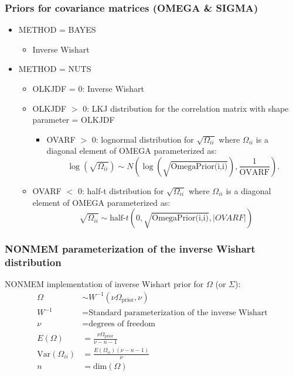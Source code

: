 \documentclass{beamer}
\begin{document}
\begin{frame}
  \frametitle{Priors for covariance matrices (OMEGA \& SIGMA)}

    \begin{itemize}
  \item METHOD = BAYES
    \begin{itemize}
    \item Inverse Wishart
    \end{itemize}
    \item METHOD = NUTS
      \begin{itemize}
      \item OLKJDF = 0: Inverse Wishart
       \item OLKJDF $>$ 0: LKJ distribution for the correlation matrix
         with shape parameter = OLKJDF
         \begin{itemize}
         \item OVARF $>$ 0: lognormal distribution for
           $\sqrt{\Omega_{ii}}$ where $\Omega_{ii}$ is a diagonal
           element of OMEGA parameterized as:
           $$
           \log(\sqrt{\Omega_{ii}}) \sim
           N\left(\log\left(\sqrt{\text{OmegaPrior(i,i)}}\right), \frac{1}{\text{OVARF}}\right).
           $$
         \end{itemize}
       \item OVARF $<$ 0:  half-t distribution for
           $\sqrt{\Omega_{ii}}$ where $\Omega_{ii}$ is a diagonal
           element of OMEGA parameterized as:
           $$
           \sqrt{\Omega_{ii}} \sim \text{half-}t\left(0,
             \sqrt{\text{OmegaPrior(i,i)}}, \left|OVARF\right|\right)
             $$
     \end{itemize}
    \end{itemize}

  
\end{frame}

\begin{frame}
  \frametitle{NONMEM parameterization of the inverse Wishart distribution}
  
NONMEM implementation of inverse Wishart prior for $\Omega$ (or
    $\Sigma$):
    \begin{align*}
      \Omega &\sim W^{-1}\left(\nu\Omega_\text{prior}, \nu\right) \\
W^{-1} &= \text{Standard parameterization of the inverse Wishart} \\
\nu &= \text{degrees of freedom} \\
E\left(\Omega\right) &= \frac{\nu\Omega_\text{prior}}{\nu - n - 1} \\
\text{Var}\left(\Omega_{ii}\right) &= \frac{E\left(\Omega_{ii}\right)  \left(\nu - n -
                          1\right)}{\nu} \\
n &= \text{dim}\left(\Omega\right)
    \end{align*}

\end{frame}
\end{document}
